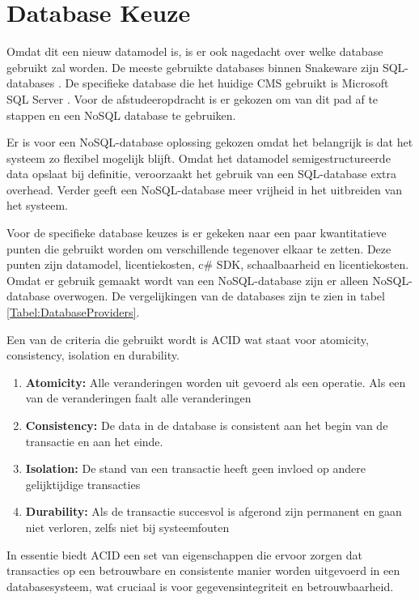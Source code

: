 \section{Database Keuze}
Omdat dit een nieuw datamodel is, is er ook nagedacht over welke database gebruikt zal worden.
De meeste gebruikte databases binnen Snakeware zijn SQL-databases \parencite{SQL}.
De specifieke database die het huidige CMS gebruikt is Microsoft SQL Server \parencite{MSQLServer}.
Voor de afstudeeropdracht is er gekozen om van dit pad af te stappen en een NoSQL \parencite{NoSQL} database te gebruiken.

\whitespace
Er is voor een NoSQL-database oplossing gekozen omdat het belangrijk is dat het systeem zo flexibel mogelijk blijft.
Omdat het datamodel semigestructureerde data opslaat bij definitie, veroorzaakt het gebruik van een SQL-database extra overhead.
Verder geeft een NoSQL-database meer vrijheid in het uitbreiden van het systeem.

\whitespace
Voor de specifieke database keuzes is er gekeken naar een paar kwantitatieve punten die gebruikt worden om verschillende tegenover elkaar te zetten.
Deze punten zijn datamodel, licentiekosten, c\# \gls{SDK}, schaalbaarheid en licentiekosten.
Omdat er gebruik gemaakt wordt van een NoSQL-database zijn er alleen NoSQL-database overwogen.
De vergelijkingen van de databases zijn te zien in tabel \ref{Tabel:DatabaseProviders}.

\whitespace
Een van de criteria die gebruikt wordt is ACID \parencite{ACID} wat staat voor atomicity, consistency, isolation en durability.
\begin{enumerate}
	\item{\textbf{Atomicity:} Alle veranderingen worden uit gevoerd als een operatie.
	      Als een van de veranderingen faalt alle veranderingen}
	\item{\textbf{Consistency:} De data in de database is consistent aan het begin van de transactie en aan het einde.}
	\item{\textbf{Isolation:} De stand van een transactie heeft geen invloed op andere gelijktijdige transacties }
	\item{\textbf{Durability:} Als de transactie succesvol is afgerond zijn permanent en gaan niet verloren, zelfs niet bij systeemfouten  }
\end{enumerate}

In essentie biedt ACID een set van eigenschappen die ervoor zorgen dat transacties op een betrouwbare en consistente manier worden uitgevoerd in een databasesysteem, wat cruciaal is voor gegevensintegriteit en betrouwbaarheid.


